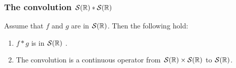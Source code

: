 
\begin{frame}
\frametitle{The convolution $\mathcal{S}(\mathbb{R}) * \mathcal{S}(\mathbb{R})$}
\begin{theorem}
Assume that $f$  and $g$ are in  $\mathcal{S}(\mathbb{R})$. Then the following hold:
\begin{enumerate}[label=(\roman*)]
\item $f*g$ is in $\mathcal{S}(\mathbb{R})$ .
\item The convolution is a continuous operator from $\mathcal{S}(\mathbb{R}) \times \mathcal{S}(\mathbb{R})$  to $\mathcal{S}(\mathbb{R})$.
\end{enumerate}
\end{theorem}
\end{frame}



